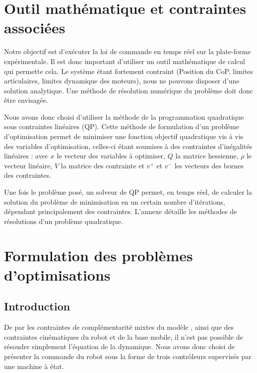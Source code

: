 	\section{Outil mathématique et contraintes associées}
	
		Notre objectif est d'exécuter la loi de commande en temps réel sur la plate-forme expérimentale. 
		Il est donc important d'utiliser un outil mathématique de calcul qui permette cela.
		Le système étant fortement contraint (Position du CoP, limites articulaires, limites dynamique des moteurs), nous ne pouvons disposer d'une solution analytique.
		Une méthode de résolution numérique du problème doit donc être envisagée.
		
		Nous avons donc choisi d'utiliser la méthode de la programmation quadratique sous contraintes linéaires (QP).
		Cette méthode de formulation d'un problème d'optimisation permet de minimiser une fonction objectif quadratique vis à vis des variables d'optimisation, celles-ci étant soumises à des contraintes d'inégalités linéaires :
		avec $x$ le vecteur des variables à optimiser, $Q$ la matrice hessienne, $\rho$ le vecteur linéaire, $V$ la matrice des contrainte et $v^+$ et $v^-$ les vecteurs des bornes des contraintes.
		
		Une fois le problème posé, un solveur de QP permet, en temps réel, de calculer la solution du problème de minimisation en un certain nombre d'itérations, dépendant principalement des contraintes.
		L’annexe  détaille les méthodes de résolutions d'un problème quadratique.


	\section{Formulation des problèmes d'optimisations}
		\subsection{Introduction}
		
 			De par les contraintes de complémentarité mixtes du modèle , ainsi que des contraintes cinématiques du robot et de la base mobile, il n'est pas possible de résoudre simplement l'équation de la dynamique.
 			Nous avons donc choisi de présenter la commande du robot sous la forme de trois contrôleurs supervisés par une machine à état.
 			
